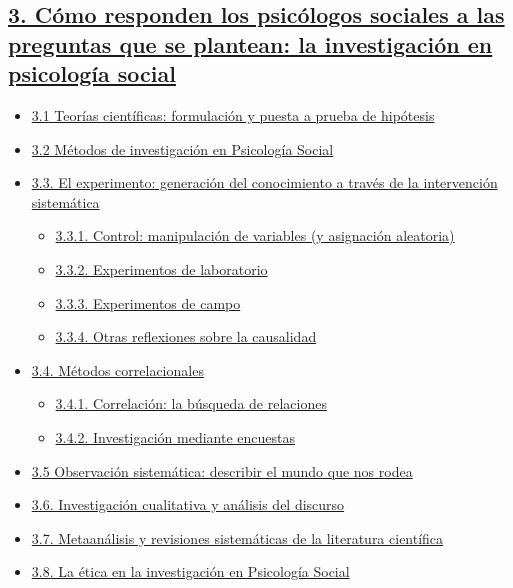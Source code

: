 \documentclass[
]{website}
\providecommand{\tightlist}{%
  \setlength{\itemsep}{0pt}\setlength{\parskip}{0pt}}
\begin{document}
\subsection*{\texorpdfstring{\hyperref[tema3]{3. Cómo responden los psicólogos sociales a las preguntas que se plantean: la investigación en psicología social}}{3. Cómo responden los psicólogos sociales a las preguntas que se plantean: la investigación en psicología social}}\label{cuxf3mo-responden-los-psicuxf3logos-sociales-a-las-preguntas-que-se-plantean-la-investigaciuxf3n-en-psicologuxeda-social}

\begin{itemize}
\tightlist
\item
  \hyperref[subtema3_1]{3.1 Teorías científicas: formulación y puesta a prueba de hipótesis}
\item
  \hyperref[subtema3_2]{3.2 Métodos de investigación en Psicología Social}
\item
  \hyperref[subtema3_3]{3.3. El experimento: generación del conocimiento a través de la intervención sistemática}

  \begin{itemize}
  \tightlist
  \item
    \hyperref[subtema3_3_1]{3.3.1. Control: manipulación de variables (y asignación aleatoria)}
  \item
    \hyperref[subtema3_3_2]{3.3.2. Experimentos de laboratorio}
  \item
    \hyperref[subtema3_3_3]{3.3.3. Experimentos de campo}
  \item
    \hyperref[subtema3_3_4]{3.3.4. Otras reflexiones sobre la causalidad}
  \end{itemize}
\item
  \hyperref[subtema3_4]{3.4. Métodos correlacionales}

  \begin{itemize}
  \tightlist
  \item
    \hyperref[subtema3_4_1]{3.4.1. Correlación: la búsqueda de relaciones}
  \item
    \hyperref[subtema3_4_2]{3.4.2. Investigación mediante encuestas}
  \end{itemize}
\item
  \hyperref[subtema3_5]{3.5 Observación sistemática: describir el mundo que nos rodea}
\item
  \hyperref[subtema3_6]{3.6. Investigación cualitativa y análisis del discurso}
\item
  \hyperref[subtema3_7]{3.7. Metaanálisis y revisiones sistemáticas de la literatura científica}
\item
  \hyperref[subtema3_8]{3.8. La ética en la investigación en Psicología Social}
\end{itemize}
\end{document}
